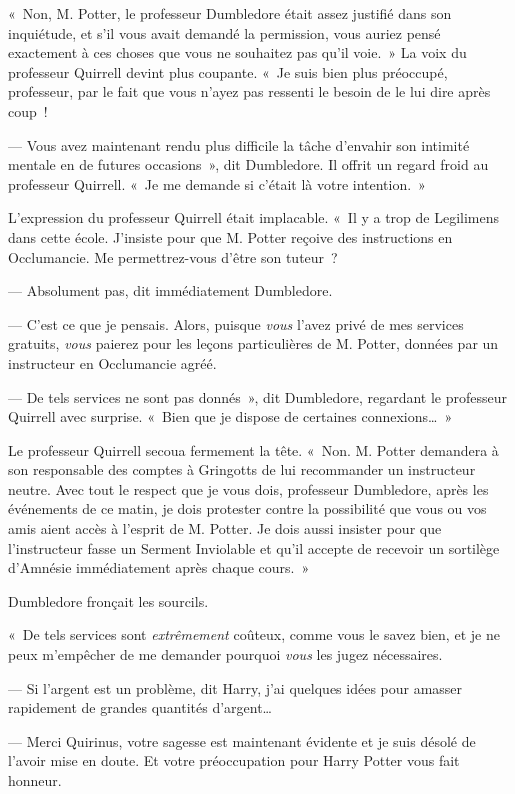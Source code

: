 «~Non, M. Potter, le professeur Dumbledore était assez justifié dans son inquiétude, et s'il vous avait demandé la permission, vous auriez pensé exactement à ces choses que vous ne souhaitez pas qu'il voie.~»
La voix du professeur Quirrell devint plus coupante.
«~Je suis bien plus préoccupé, professeur, par le fait que vous n'ayez pas ressenti le besoin de le lui dire après coup~!

--- Vous avez maintenant rendu plus difficile la tâche d'envahir son intimité mentale en de futures occasions~», dit Dumbledore.
Il offrit un regard froid au professeur Quirrell.
«~Je me demande si c'était là votre intention.~»

L'expression du professeur Quirrell était implacable.
«~Il y a trop de Legilimens dans cette école.
J'insiste pour que M. Potter reçoive des instructions en Occlumancie.
Me permettrez-vous d'être son tuteur~?

--- Absolument pas, dit immédiatement Dumbledore.

--- C'est ce que je pensais.
Alors, puisque \emph{vous} l'avez privé de mes services gratuits, \emph{vous} paierez pour les leçons particulières de M. Potter, données par un instructeur en Occlumancie agréé.

--- De tels services ne sont pas donnés~», dit Dumbledore, regardant le professeur Quirrell avec surprise.
«~Bien que je dispose de certaines connexions…~»

Le professeur Quirrell secoua fermement la tête.
«~Non. M. Potter demandera à son responsable des comptes à Gringotts de lui recommander un instructeur neutre.
Avec tout le respect que je vous dois, professeur Dumbledore, après les événements de ce matin, je dois protester contre la possibilité que vous ou vos amis aient accès à l'esprit de M. Potter.
Je dois aussi insister pour que l'instructeur fasse un Serment Inviolable et qu'il accepte de recevoir un sortilège d'Amnésie immédiatement après chaque cours.~»

Dumbledore fronçait les sourcils.

«~De tels services sont \emph{extrêmement} coûteux, comme vous le savez bien, et je ne peux m'empêcher de me demander pourquoi \emph{vous} les jugez nécessaires.

--- Si l'argent est un problème, dit Harry, j'ai quelques idées pour amasser rapidement de grandes quantités d'argent…

--- Merci Quirinus, votre sagesse est maintenant évidente et je suis désolé de l'avoir mise en doute.
Et votre préoccupation pour Harry Potter vous fait honneur.

